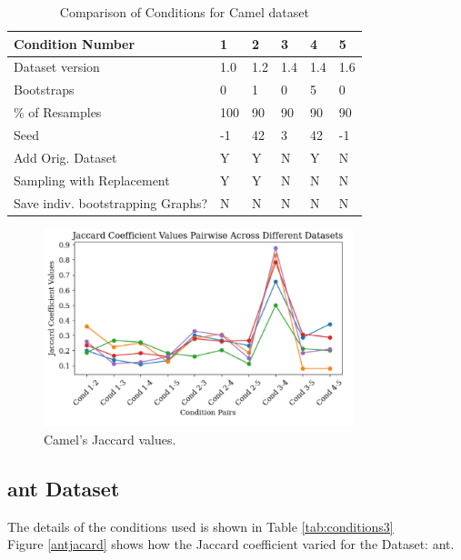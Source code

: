 \documentclass[sigconf,review,anonymous,nonacm=true]{acmart}
\begin{document}
\begin{table}[h]
\centering
\caption{Comparison of Conditions for Camel dataset}
\label{tab:conditions2}
\begin{tabularx}{0.5\textwidth}{|l|X|X|X|X|X|}
\hline
\textbf{Condition Number} & \textbf{1} & \textbf{2} & \textbf{3} & \textbf{4} & \textbf{5} \\ \hline
Dataset version           & 1.0   & 1.2   & 1.4   & 1.4   & 1.6   \\ \hline
Bootstraps         & 0                & 1                & 0                & 5                & 0                \\ \hline
\% of Resamples    & 100            & 90             & 90             & 90            & 90            \\ \hline
Seed               & -1               & 42               & 3                & 42               & -1               \\ \hline
Add Orig. Dataset  & Y                & Y                & N                & Y                & N                \\ \hline
Sampling with Replacement     & Y                & Y                & N                & N                & N                \\ \hline
Save indiv. bootstrapping Graphs?  & N                & N                & N                & N                & N                \\ \hline
\end{tabularx}
\end{table}

\begin{figure}[h]
\caption{Camel's Jaccard values.}\label{camjacard}
\includegraphics[width=9cm]{images/camel.png}
\end{figure}

\subsection{ant Dataset}
The details of the conditions used is shown in Table \ref{tab:conditions3}\\
Figure \ref{antjacard} shows how the Jaccard coefficient varied for the Dataset: ant. 
\end{document}
